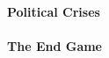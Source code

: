\documentclass[11pt,a4paper,oneside,english]{article}
\begin{document}




\paragraph{Political Crises}



\paragraph{The End Game}
\end{document}
